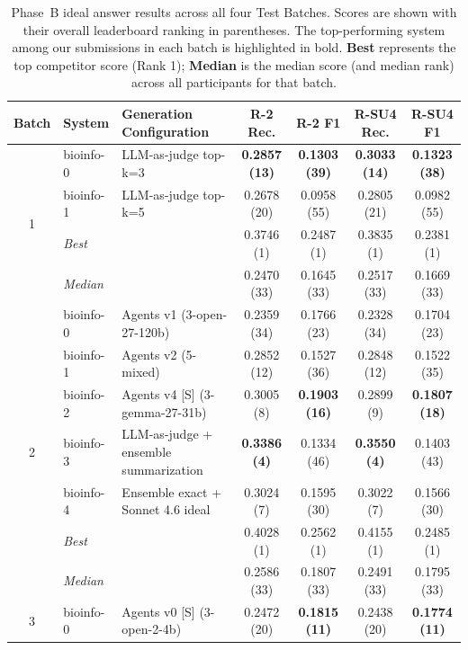 \begin{table}[ht]
  \centering
  \caption{Phase~B ideal answer results across all four Test Batches. Scores are shown with their overall leaderboard ranking in parentheses. The top-performing system among our submissions in each batch is highlighted in bold. \textbf{Best} represents the top competitor score (Rank 1); \textbf{Median} is the median score (and median rank) across all participants for that batch.}
  \label{tab:phaseb-ideal-all}
  \footnotesize
  \begin{tabular}{cl|p{5.5cm}|cccc}
    \toprule
    \textbf{Batch} & \textbf{System} & \textbf{Generation Configuration} & \textbf{R-2 Rec.} & \textbf{R-2 F1} & \textbf{R-SU4 Rec.} & \textbf{R-SU4 F1} \\
    \midrule
    \multirow{4}{*}{1}
    & bioinfo-0 & LLM-as-judge top-k=3 & \textbf{0.2857 (13)} & \textbf{0.1303 (39)} & \textbf{0.3033 (14)} & \textbf{0.1323 (38)} \\
    & bioinfo-1 & LLM-as-judge top-k=5 & 0.2678 (20) & 0.0958 (55) & 0.2805 (21) & 0.0982 (55) \\
    \cmidrule(l){2-7}
    & \textit{Best} & \multicolumn{1}{l|}{} & 0.3746 (1) & 0.2487 (1) & 0.3835 (1) & 0.2381 (1) \\
    & \textit{Median}& \multicolumn{1}{l|}{} & 0.2470 (33) & 0.1645 (33) & 0.2517 (33) & 0.1669 (33) \\
    \midrule
    \multirow{7}{*}{2}
    & bioinfo-0 & Agents v1 (3-open-27-120b) & 0.2359 (34) & 0.1766 (23) & 0.2328 (34) & 0.1704 (23) \\
    & bioinfo-1 & Agents v2 (5-mixed) & 0.2852 (12) & 0.1527 (36) & 0.2848 (12) & 0.1522 (35) \\
    & bioinfo-2 & Agents v4 [S] (3-gemma-27-31b) & 0.3005 (8) & \textbf{0.1903 (16)} & 0.2899 (9) & \textbf{0.1807 (18)} \\
    & bioinfo-3 & LLM-as-judge + ensemble summarization & \textbf{0.3386 (4)} & 0.1334 (46) & \textbf{0.3550 (4)} & 0.1403 (43) \\
    & bioinfo-4 & Ensemble exact + Sonnet 4.6 ideal & 0.3024 (7) & 0.1595 (30) & 0.3022 (7) & 0.1566 (30) \\
    \cmidrule(l){2-7}
    & \textit{Best} & \multicolumn{1}{l|}{} & 0.4028 (1) & 0.2562 (1) & 0.4155 (1) & 0.2485 (1) \\
    & \textit{Median}& \multicolumn{1}{l|}{} & 0.2586 (33) & 0.1807 (33) & 0.2491 (33) & 0.1795 (33) \\
    \midrule
    \multirow{7}{*}{3}
    & bioinfo-0 & Agents v0 [S] (3-open-2-4b) & 0.2472 (20) & \textbf{0.1815 (11)} & 0.2438 (20) & \textbf{0.1774 (11)} \\

\end{tabular}
\end{table}
